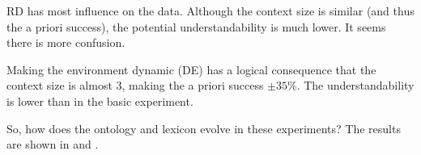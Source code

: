 RD has most influence on the data. Although the context size is similar (and thus the a priori success), the potential understandability is much lower. It seems there is more confusion.

Making the environment dynamic (DE) has a logical consequence that the context size is almost 3, making the a priori success $\pm 35$\%. The understandability is lower than in the basic experiment.


So, how does the ontology and lexicon evolve in these experiments? The results are shown in  and .

\begin{figure}
\centering
{}
\\
\\

\end{figure}
